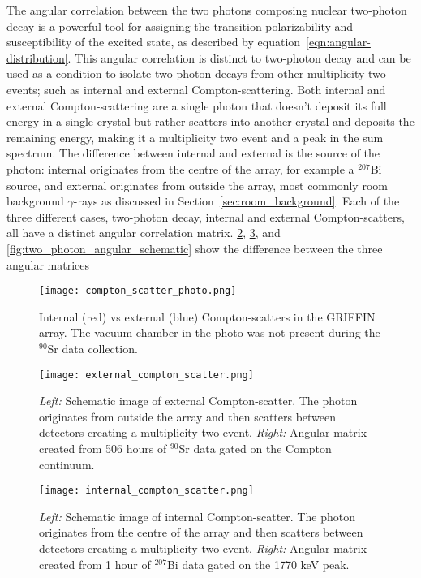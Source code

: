 \documentclass[cnatzke_thesis_proposal.tex]{subfiles}
\begin{document}
The angular correlation between the two photons composing nuclear two-photon decay is a powerful tool for assigning the transition polarizability and susceptibility of the excited state, as described by equation~\ref{eqn:angular-distribution}.
This angular correlation is distinct to two-photon decay and can be used as a condition to isolate two-photon decays from other multiplicity two events; such as internal and external Compton-scattering.
Both internal and external Compton-scattering are a single photon that doesn't deposit its full energy in a single crystal but rather scatters into another crystal and deposits the remaining energy, making it a multiplicity two event and a peak in the sum spectrum.
The difference between internal and external is the source of the photon: internal originates from the centre of the array, for example a $^{207}$Bi source, and external originates from outside the array, most commonly room background $\gamma$-rays as discussed in Section~\ref{sec:room_background}.
Each of the three different cases, two-photon decay, internal and external Compton-scatters, all have a distinct angular correlation matrix.
\ref{fig:external_compton_scatter_schematic}, \ref{fig:internal_compton_scatter_schematic}, and \ref{fig:two_photon_angular_schematic} show the difference between the three angular matrices

\begin{figure}[htbp]
    \centering
    \texttt{[image: compton\_scatter\_photo.png]}
    \caption{Internal (red) vs external (blue) Compton-scatters in the GRIFFIN array. The vacuum chamber in the photo was not present during the $^{90}$Sr data collection.}
    \label{fig:compton_scatter_griffin_photo}
\end{figure}

\begin{figure}[htbp]
  \centering
  \texttt{[image: external\_compton\_scatter.png]}
  \caption{
    \textit{Left:} Schematic image of external Compton-scatter. The photon originates from outside the array and then scatters between detectors creating a multiplicity two event.
    \textit{Right:} Angular matrix created from 506 hours of $^{90}$Sr data gated on the Compton continuum.
  }
  \label{fig:external_compton_scatter_schematic}
\end{figure}

\begin{figure}[htbp]
  \centering
  \texttt{[image: internal\_compton\_scatter.png]}
  \caption{
    \textit{Left:} Schematic image of internal Compton-scatter. The photon originates from the centre of the array and then scatters between detectors creating a multiplicity two event.
    \textit{Right:} Angular matrix created from 1 hour of $^{207}$Bi data gated on the 1770 keV peak.
  }
  \label{fig:internal_compton_scatter_schematic}
\end{figure}
\end{document}
